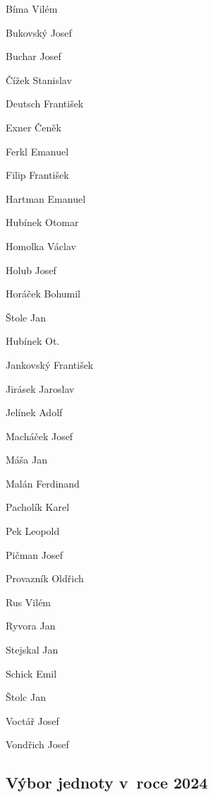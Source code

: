 \documentclass[a5paper, 11pt, twoside]{article}
\begin{document}
\begin{multicols}{2}
Bíma Vilém

Bukovský Josef

Buchar Josef

Čížek Stanislav

Deutsch František

Exner Čeněk

Ferkl Emanuel

Filip František

Hartman Emanuel

Hubínek Otomar

Homolka Václav

Holub Josef

Horáček Bohumil

Štole Jan

Hubínek Ot.

Jankovský František

Jirásek Jaroslav

Jelínek Adolf

Macháček Josef

Máša Jan

Malán Ferdinand

Pacholík Karel

Pek Leopold

Pičman Josef

Provazník Oldřich

Rus Vilém

Ryvora Jan

Stejskal Jan

Schick Emil

Štolc Jan

Voctář Josef

Vondřich Josef

\end{multicols}

\subsection{Výbor jednoty v~roce
2024}
\end{document}
